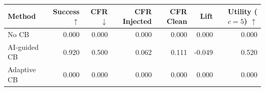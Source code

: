 \begin{tabular}{lrrrrrr}
\toprule
Method & Success $\uparrow$ & CFR $\downarrow$ & CFR Injected & CFR Clean & Lift & Utility ($c=5$) $\uparrow$ \\
\midrule
No CB & 0.000 & 0.000 & 0.000 & 0.000 & 0.000 & 0.000 \\
AI-guided CB & 0.920 & 0.500 & 0.062 & 0.111 & -0.049 & 0.520 \\
Adaptive CB & 0.000 & 0.000 & 0.000 & 0.000 & 0.000 & 0.000 \\
\bottomrule
\end{tabular}
